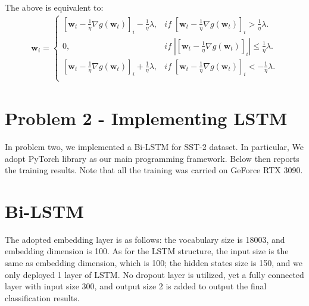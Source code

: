 \documentclass[a4paper,12pt]{article}
\begin{document}
The above is equivalent to: %
\begin{align}
   \textbf{w}_i = 
   \begin{cases}
      [\textbf{w}_t - \frac{1}{\eta}\nabla g(\textbf{w}_t)]_i - \frac{1}{\eta} \lambda, & if \; [\textbf{w}_t - \frac{1}{\eta}\nabla g(\textbf{w}_t)]_i > \frac{1}{\eta}\lambda.\\
      0, & if \; |[\textbf{w}_t - \frac{1}{\eta}\nabla g(\textbf{w}_t)]_i| \leq \frac{1}{\eta}\lambda.\\
      [\textbf{w}_t - \frac{1}{\eta}\nabla g(\textbf{w}_t)]_i + \frac{1}{\eta} \lambda, & if \; [\textbf{w}_t - \frac{1}{\eta}\nabla g(\textbf{w}_t)]_i < -\frac{1}{\eta}\lambda.\\
    \end{cases}
\end{align}


\section*{Problem 2 - Implementing LSTM}
In problem two, we implemented a Bi-LSTM for SST-2 dataset.
In particular, We adopt PyTorch library as our main programming framework. 
Below then reports the training results. Note that all the training was carried on GeForce RTX 3090.


\section*{Bi-LSTM}
The adopted embedding layer is as follows:
the vocabulary size is 18003, and 
embedding dimension is 100.
As for the LSTM structure,
the input size is the same as embedding dimension, which is 100;
the hidden states size is 150, 
and we only deployed 1 layer of LSTM.
No dropout layer is utilized, yet a fully connected layer with 
input size 300, and output size 2 is added to output the final classification results.
\end{document}
